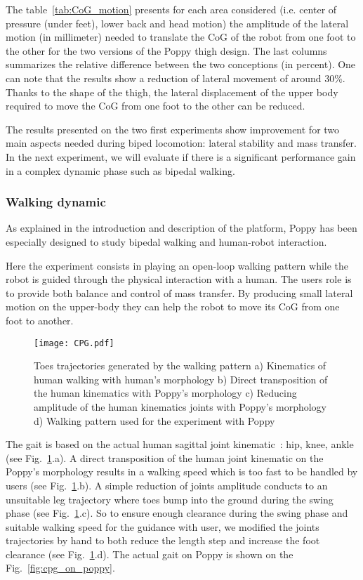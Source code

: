 The table~\ref{tab:CoG_motion} presents for each area considered (i.e. center of pressure (under feet), lower back and head motion) the amplitude of the lateral motion (in millimeter) needed to translate the CoG of the robot from one foot to the other for the two versions of the Poppy thigh design. The last columns summarizes the relative difference between the two conceptions (in percent). One can note that the results show a reduction of lateral movement of around 30\%. Thanks to the shape of the thigh, the lateral displacement of the upper body required to move the CoG from one foot to the other can be reduced.


The results presented on the two first experiments show improvement for two main aspects needed during biped locomotion: lateral stability and mass transfer. In the next experiment, we will evaluate if there is a significant performance gain in a complex dynamic phase such as bipedal walking.


\subsubsection{Walking dynamic} %
\label{sub:walking_dynamic}

As explained in the introduction and description of the platform, Poppy has been especially designed to study bipedal walking and human-robot interaction.

Here the experiment consists in playing an open-loop walking pattern while the robot is guided through the physical interaction with a human. The users role is to provide both balance and control of mass transfer. By producing small lateral motion on the upper-body they can help the robot to move its CoG from one foot to another.

\begin{figure}[h]
    \centering
    \texttt{[image: CPG.pdf]}
    \caption{Toes trajectories generated by the walking pattern a) Kinematics of human walking
    with human's morphology b) Direct transposition of the human kinematics with Poppy's morphology
    c) Reducing amplitude of the human kinematics joints with Poppy's morphology d) Walking pattern
    used for the experiment with Poppy}
    \label{fig:CPG}
\end{figure}

The gait is based on the actual human sagittal joint kinematic~\cite{Nester2003}: hip, knee, ankle (see Fig.~\ref{fig:CPG}.a). A direct transposition of the human joint kinematic on the Poppy's morphology results in a walking speed which is too fast to be handled by users (see Fig.~\ref{fig:CPG}.b). A simple reduction of joints amplitude conducts to an unsuitable leg trajectory where toes bump into the ground during the swing phase (see Fig.~\ref{fig:CPG}.c). So to ensure enough clearance during the swing phase and suitable walking speed for the guidance with user, we modified the joints trajectories by hand to both reduce the length step and increase the foot clearance (see Fig.~\ref{fig:CPG}.d). The actual gait on Poppy is shown on the Fig.~\ref{fig:cpg_on_poppy}.

